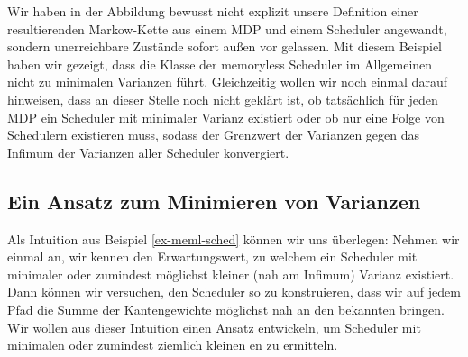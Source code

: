 \documentclass[a4paper]{article}
\newcommand{\mc}{Markow-Kette}
\theoremstyle{nonumberplain}
\begin{document}
Wir haben in der Abbildung bewusst nicht explizit unsere Definition einer resultierenden \mc{} aus einem MDP und einem Scheduler angewandt, sondern unerreichbare Zustände sofort außen vor gelassen. Mit diesem Beispiel haben wir gezeigt, dass die Klasse der memoryless Scheduler im Allgemeinen nicht zu minimalen Varianzen führt. Gleichzeitig wollen wir noch einmal darauf hinweisen, dass an dieser Stelle noch nicht geklärt ist, ob tatsächlich für jeden MDP ein Scheduler mit minimaler Varianz existiert oder ob nur eine Folge von Schedulern existieren muss, sodass der Grenzwert der Varianzen gegen das Infimum der Varianzen aller Scheduler konvergiert.

\subsection{Ein Ansatz zum Minimieren von Varianzen}

Als Intuition aus Beispiel \ref{ex-meml-sched} können wir uns überlegen: Nehmen wir einmal an, wir kennen den Erwartungswert, zu welchem ein Scheduler mit minimaler oder zumindest möglichst kleiner (nah am Infimum) Varianz existiert. Dann können wir versuchen, den Scheduler so zu konstruieren, dass wir auf jedem Pfad die Summe der Kantengewichte möglichst nah an den bekannten \expect{} bringen. Wir wollen aus dieser Intuition einen Ansatz entwickeln, um Scheduler mit minimalen oder zumindest ziemlich kleinen \var{}en zu ermitteln.
\end{document}
